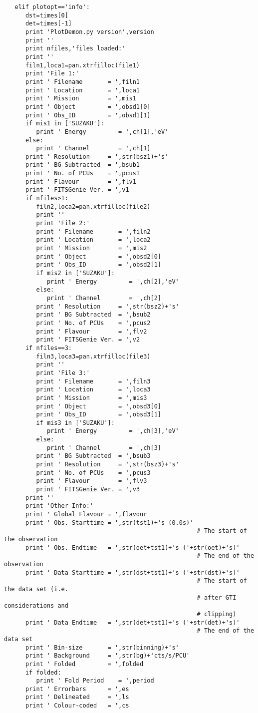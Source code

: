 \begin{verbatim}
   elif plotopt=='info':
      dst=times[0]
      det=times[-1]
      print 'PlotDemon.py version',version
      print ''
      print nfiles,'files loaded:'
      print ''
      filn1,loca1=pan.xtrfilloc(file1)
      print 'File 1:'
      print ' Filename       = ',filn1
      print ' Location       = ',loca1
      print ' Mission        = ',mis1
      print ' Object         = ',obsd1[0]
      print ' Obs_ID         = ',obsd1[1]
      if mis1 in ['SUZAKU']:
         print ' Energy         = ',ch[1],'eV'
      else:
         print ' Channel        = ',ch[1]
      print ' Resolution     = ',str(bsz1)+'s'
      print ' BG Subtracted  = ',bsub1
      print ' No. of PCUs    = ',pcus1
      print ' Flavour        = ',flv1
      print ' FITSGenie Ver. = ',v1
      if nfiles>1:
         filn2,loca2=pan.xtrfilloc(file2)
         print ''
         print 'File 2:'
         print ' Filename       = ',filn2
         print ' Location       = ',loca2
         print ' Mission        = ',mis2
         print ' Object         = ',obsd2[0]
         print ' Obs_ID         = ',obsd2[1]
         if mis2 in ['SUZAKU']:
            print ' Energy         = ',ch[2],'eV'
         else:
            print ' Channel        = ',ch[2]
         print ' Resolution     = ',str(bsz2)+'s'
         print ' BG Subtracted  = ',bsub2
         print ' No. of PCUs    = ',pcus2
         print ' Flavour        = ',flv2
         print ' FITSGenie Ver. = ',v2
      if nfiles==3:
         filn3,loca3=pan.xtrfilloc(file3)
         print ''
         print 'File 3:'
         print ' Filename       = ',filn3
         print ' Location       = ',loca3
         print ' Mission        = ',mis3
         print ' Object         = ',obsd3[0]
         print ' Obs_ID         = ',obsd3[1]
         if mis3 in ['SUZAKU']:
            print ' Energy         = ',ch[3],'eV'
         else:
            print ' Channel        = ',ch[3]
         print ' BG Subtracted  = ',bsub3
         print ' Resolution     = ',str(bsz3)+'s'
         print ' No. of PCUs    = ',pcus3
         print ' Flavour        = ',flv3
         print ' FITSGenie Ver. = ',v3
      print ''
      print 'Other Info:'
      print ' Global Flavour = ',flavour
      print ' Obs. Starttime = ',str(tst1)+'s (0.0s)'
                                                      # The start of the observation
      print ' Obs. Endtime   = ',str(oet+tst1)+'s ('+str(oet)+'s)'
                                                      # The end of the observation
      print ' Data Starttime = ',str(dst+tst1)+'s ('+str(dst)+'s)'
                                                      # The start of the data set (i.e.
                                                      # after GTI considerations and
                                                      # clipping)
      print ' Data Endtime   = ',str(det+tst1)+'s ('+str(det)+'s)'
                                                      # The end of the data set
      print ' Bin-size       = ',str(binning)+'s'
      print ' Background     = ',str(bg)+'cts/s/PCU'
      print ' Folded         = ',folded
      if folded:
         print ' Fold Period    = ',period
      print ' Errorbars      = ',es
      print ' Delineated     = ',ls
      print ' Colour-coded   = ',cs


\end{verbatim}
